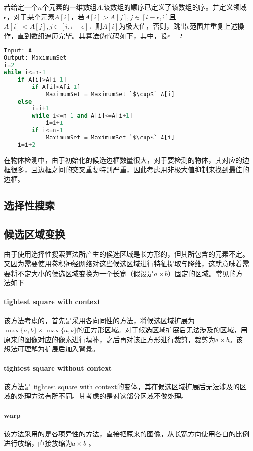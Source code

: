 若给定一个$n$个元素的一维数组$A$,该数组的顺序已定义了该数组的序。并定义领域$\epsilon$，对于某个元素$A[i]$，若$A[i]>A[j],j\in[i-\epsilon,i]$且$A[i]<A[j],j\in[i,i+\epsilon]$，则$A[i]$为极大值，否则，跳出$\epsilon$范围并重复上述操作，直到数组遍历完毕。其算法伪代码如下，其中，设$\epsilon=2$
\begin{lstlisting}[language=python]
Input: A
Output: MaximumSet
i=2
while i<=n-1
    if A[i]>A[i-1]
    	if A[i]>A[i+1]
            MaximumSet = MaximumSet `$\cup$` A[i]
    else
    	i=i+1
    	while i<=n-1 and A[i]<=A[i+1]
    		i=i+1
    	if i<=n-1
    		MaximumSet = MaximumSet `$\cup$` A[i]
    i=i+2
\end{lstlisting}

在物体检测中，由于初始化的候选边框数量很大，对于要检测的物体，其对应的边框很多，且边框之间的交叉重复特别严重，因此考虑用非极大值抑制来找到最佳的边框。

\subsection{选择性搜索}

\subsection{候选区域变换}
由于使用选择性搜索算法所产生的候选区域是长方形的，但其所包含的元素不定。又因为需要使用卷积神经网络对这些候选区域进行特征提取与降维，这就意味着需要将不定大小的候选区域变换为一个长宽（假设是$a\times b$）固定的区域。常见的方法如下
\paragraph{tightest square with context}该方法考虑的，首先是采用各向同性的方法，将候选区域扩展为$\max\{a,b\}\times\max\{a,b\}$的正方形区域。对于候选区域扩展后无法涉及的区域，用原来的图像对应的像素进行填补，之后再对该正方形进行裁剪，裁剪为$a\times b$。该想法可理解为扩展后加入背景。
\paragraph{tightest square without context}该方法是 tightest square with context的变体，其在候选区域扩展后无法涉及的区域的处理方法有所不同。其考虑的是对这部分区域不做处理。
\paragraph{warp}该方法采用的是各项异性的方法，直接把原来的图像，从长宽方向使用各自的比例进行放缩，直接放缩为$a\times b$ 。
